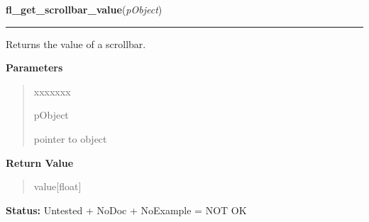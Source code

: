     \label{xformslib:library:fl_get_scrollbar_value}

    \vspace{0.5ex}

\hspace{.8\funcindent}\begin{boxedminipage}{\funcwidth}

    \raggedright \textbf{fl\_get\_scrollbar\_value}(\textit{pObject})

    \vspace{-1.5ex}

    \rule{\textwidth}{0.5\fboxrule}
\setlength{\parskip}{2ex}
    Returns the value of a scrollbar.

\setlength{\parskip}{1ex}
      \textbf{Parameters}
      \vspace{-1ex}

      \begin{quote}
        \begin{Ventry}{xxxxxxx}

          \item[pObject]

          pointer to object

        \end{Ventry}

      \end{quote}

      \textbf{Return Value}
    \vspace{-1ex}

      \begin{quote}
      value[float]

      \end{quote}

\textbf{Status:} Untested + NoDoc + NoExample = NOT OK



    \end{boxedminipage}

    \label{xformslib:library:fl_set_scrollbar_value}

    \vspace{0.5ex}

